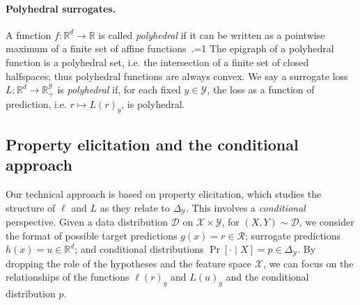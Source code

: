 \documentclass{article}
\newtheorem{theorem}{Theorem}
\theoremstyle{definition}\newtheorem{definition}{Definition}
\theoremstyle{definition}\newtheorem{assumption}{Assumption}
\newcommand{\Comments}{1}
\newcommand{\mynote}[2]{\ifnum\Comments=1\textcolor{#1}{#2}\fi}
\newcommand{\mytodo}[2]{\ifnum\Comments=1%
  \todo[linecolor=#1!80!black,backgroundcolor=#1,bordercolor=#1!80!black]{#2}\fi}
\newcommand{\raf}[1]{\mynote{green}{[RF: #1]}}
\newcommand{\botodo}[1]{\mytodo{blue!20!white}{[Bo: #1]}}
\newcommand{\reals}{\mathbb{R}}
\newcommand{\simplex}{\Delta_\Y}
\newcommand{\D}{\mathcal{D}}
\newcommand{\R}{\mathcal{R}}
\newcommand{\X}{\mathcal{X}}
\newcommand{\Y}{\mathcal{Y}}
\begin{document}
%
%
%


\paragraph{Polyhedral surrogates.}
A function $f: \reals^d \to \reals$ is called \emph{polyhedral} if it can be written as a pointwise maximum of a finite set of affine functions~\citep{rockafellar1997convex}.\botodo{theorem/chapter?}
The epigraph of a polyhedral function is a polyhedral set, i.e. the intersection of a finite set of closed halfspaces; thus polyhedral functions are always convex.
We say a surrogate loss $L: \reals^d \to \reals_+^{\Y}$ is \emph{polyhedral} if, for each fixed $y \in \Y$, the loss as a function of prediction, i.e. $r \mapsto L(r)_y$, is polyhedral.

\subsection{Property elicitation and the conditional approach} \label{subsec:elic}
Our technical approach is based on property elicitation, which studies the structure of $\ell$ and $L$ as they relate to $\simplex$.
This involves a \emph{conditional} perspective.
Given a data distribution $\D$ on $\X \times \Y$, for $(X,Y) \sim \D$, we consider the format of possible target predictions $g(x) = r \in \R$; surrogate predictions $h(x) = u \in \reals^d$; and conditional distributions $\Pr[ \cdot \mid X] = p \in \simplex$.
By dropping the role of the hypotheses and the feature space $\X$, we can focus on the relationships of the functions $\ell(r)_y$ and $L(u)_y$ and the conditional distribution $p$.
\end{document}
